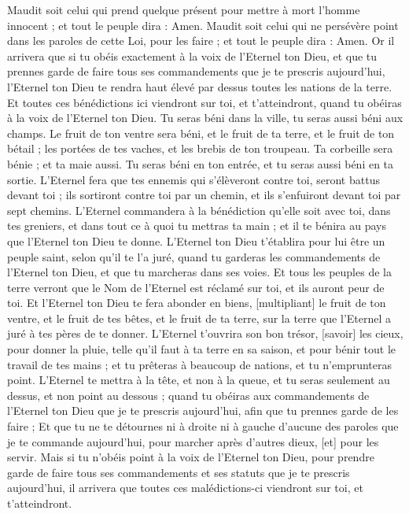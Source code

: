 \begin{multicols}{2}
Maudit soit celui qui prend quelque présent pour mettre à mort l'homme innocent ; et tout le peuple dira : Amen.
Maudit soit celui qui ne persévère point dans les paroles de cette Loi, pour les faire ; et tout le peuple dira : Amen.
\VerseOne{}Or il arrivera que si tu obéis exactement à la voix de l'Eternel ton Dieu, et que tu prennes garde de faire tous ses commandements que je te prescris aujourd'hui, l'Eternel ton Dieu te rendra haut élevé par dessus toutes les nations de la terre.
Et toutes ces bénédictions ici viendront sur toi, et t'atteindront, quand tu obéiras à la voix de l'Eternel ton Dieu.
Tu seras béni dans la ville, tu seras aussi béni aux champs.
Le fruit de ton ventre sera béni, et le fruit de ta terre, et le fruit de ton bétail ; les portées de tes vaches, et les brebis de ton troupeau.
Ta corbeille sera bénie ; et ta maie aussi.
Tu seras béni en ton entrée, et tu seras aussi béni en ta sortie.
L'Eternel fera que tes ennemis qui s'élèveront contre toi, seront battus devant toi ; ils sortiront contre toi par un chemin, et ils s'enfuiront devant toi par sept chemins.
L'Eternel commandera à la bénédiction qu'elle soit avec toi, dans tes greniers, et dans tout ce à quoi tu mettras ta main ; et il te bénira au pays que l'Eternel ton Dieu te donne.
L'Eternel ton Dieu t'établira pour lui être un peuple saint, selon qu'il te l'a juré, quand tu garderas les commandements de l'Eternel ton Dieu, et que tu marcheras dans ses voies.
Et tous les peuples de la terre verront que le Nom de l'Eternel est réclamé sur toi, et ils auront peur de toi.
Et l'Eternel ton Dieu te fera abonder en biens, [multipliant] le fruit de ton ventre, et le fruit de tes bêtes, et le fruit de ta terre, sur la terre que l'Eternel a juré à tes pères de te donner.
L'Eternel t'ouvrira son bon trésor, [savoir] les cieux, pour donner la pluie, telle qu'il faut à ta terre en sa saison, et pour bénir tout le travail de tes mains ; et tu prêteras à beaucoup de nations, et tu n'emprunteras point.
L'Eternel te mettra à la tête, et non à la queue, et tu seras seulement au dessus, et non point au dessous ; quand tu obéiras aux commandements de l'Eternel ton Dieu que je te prescris aujourd'hui, afin que tu prennes garde de les faire ;
Et que tu ne te détournes ni à droite ni à gauche d'aucune des paroles que je te commande aujourd'hui, pour marcher après d'autres dieux, [et] pour les servir.
Mais si tu n'obéis point à la voix de l'Eternel ton Dieu, pour prendre garde de faire tous ses commandements et ses statuts que je te prescris aujourd'hui, il arrivera que toutes ces malédictions-ci viendront sur toi, et t'atteindront.

\end{multicols}
